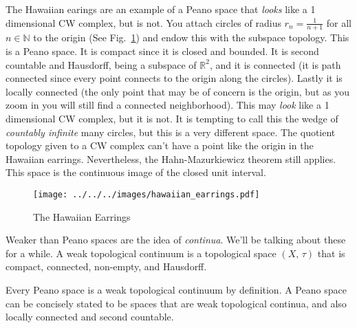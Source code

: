 \documentclass{article}
\theoremstyle{plain}
\theoremstyle{normal}
\newenvironment{example}{%
    \pushQED{\qed}\renewcommand{\qedsymbol}{$\blacksquare$}\examplex%
}{%
    \popQED\endexamplex%
}
\newenvironment{definition}{%
    \pushQED{\qed}\renewcommand{\qedsymbol}{$\blacksquare$}\definitionx%
}{%
    \popQED\enddefinitionx%
}
\begin{document}
        \begin{example}
            The Hawaiian earings are an example of a Peano space that
            \textit{looks} like a 1 dimensional CW complex, but is not.
            You attach circles of radius $r_{n}=\frac{1}{n+1}$ for all
            $n\in\mathbb{N}$ to the origin
            (See Fig.~\ref{fig:hawaiian_earrings}) and endow this with the
            subspace topology. This is a Peano space. It is compact since it is
            closed and bounded. It is second countable and Hausdorff, being a
            subspace of $\mathbb{R}^{2}$, and it is connected (it is path
            connected since every point connects to the origin along the
            circles). Lastly it is locally connected (the only point that may
            be of concern is the origin, but as you zoom in you will still find
            a connected neighborhood). This may \textit{look} like a 1
            dimensional CW complex, but it is not. It is tempting to call this
            the wedge of \textit{countably infinite} many circles, but this is
            a very different space. The quotient topology given to a CW complex
            can't have a point like the origin in the Hawaiian earrings.
            Nevertheless, the Hahn-Mazurkiewicz theorem still applies. This
            space is the continuous image of the closed unit interval.
        \end{example}
        \begin{figure}
            \centering
            \texttt{[image: ../../../images/hawaiian\_earrings.pdf]}
            \caption{The Hawaiian Earrings}
            \label{fig:hawaiian_earrings}
        \end{figure}
        Weaker than Peano spaces are the idea of \textit{continua}. We'll be
        talking about these for a while.
        \begin{definition}[Weak Topological Continuum]
            A weak topological continuum is a topological space $(X,\,\tau)$
            that is compact, connected, non-empty, and Hausdorff.%
        \end{definition}
        \begin{example}
            Every Peano space is a weak topological continuum by definition.
            A Peano space can be concisely stated to be spaces that are
            weak topological continua, and also locally connected and second
            countable.
        \end{example}
\end{document}
